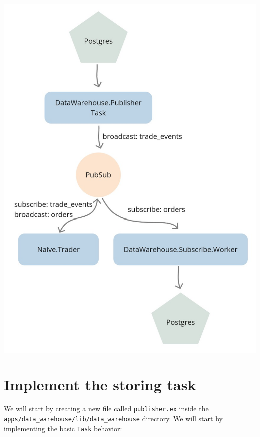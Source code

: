 \documentclass[
  oneside]{book}
\begin{document}
\begin{center}\includegraphics[width=1\linewidth,height=0.6\textheight]{images/chapter_14_03_backtest_pubsub} \end{center}

\newpage

\section{Implement the storing task}\label{implement-the-storing-task}

We will start by creating a new file called \texttt{publisher.ex} inside the\\
\texttt{apps/data\_warehouse/lib/data\_warehouse} directory. We will start by implementing the basic \texttt{Task} behavior:
\end{document}
